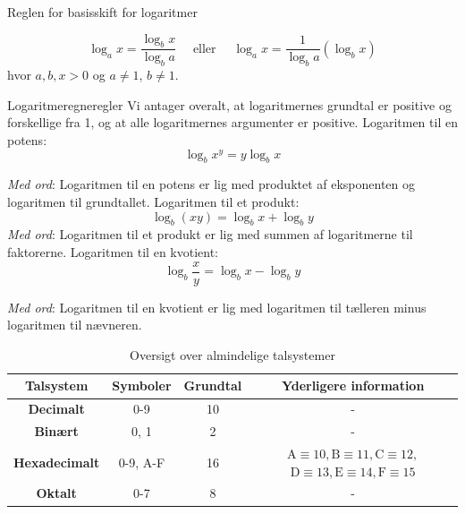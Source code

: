 \begin{custombox}{Reglen for basisskift for logaritmer}

\begin{equation*}
\log _a x=\frac{\log_b x}{\log_b a} \quad \text { eller } \quad \log_a x=\frac{1}{\log_b a}\left(\log_b x\right)
\end{equation*}
hvor $a,b,x>0$ og $a\neq1$, $b\neq1$.
    
\end{custombox}

\begin{custombox}{Logaritmeregneregler}
\setlength{\leftskip}{1cm}  %
\setlength{\rightskip}{1cm} %
Vi antager overalt, at logaritmernes grundtal er positive og forskellige fra 1, og at alle logaritmernes argumenter er positive.
Logaritmen til en potens:
$$
\log _b x^y=y \log _b x
$$

\textit{Med ord}: Logaritmen til en potens er lig med produktet af eksponenten og logaritmen til grundtallet.
\vspace{0.5cm}
Logaritmen til et produkt:
$$
\log _b(x y)=\log _b x+\log _b y
$$
\textit{Med ord}: Logaritmen til et produkt er lig med summen af logaritmerne til faktorerne.
\vspace{0.5cm}
Logaritmen til en kvotient:
$$
\log _b \frac{x}{y}=\log _b x-\log _b y
$$

\textit{Med ord}: Logaritmen til en kvotient er lig med logaritmen til tælleren minus logaritmen til nævneren.

\setlength{\leftskip}{0cm}  %
\setlength{\rightskip}{0cm} %

\end{custombox}


\begin{table}[ht]
\centering
\renewcommand{\arraystretch}{1.4}
\begin{tabular}{|c|c|c|c|}
\hline
\textbf{Talsystem} & \textbf{Symboler} & \textbf{Grundtal} & \textbf{Yderligere information} \\ \hline
\textbf{Decimalt} & 0-9 & 10 & - \\ \hline
\textbf{Binært} & 0, 1 & 2 & - \\ \hline
\textbf{Hexadecimalt} & 0-9, A-F & 16 & $\mathrm{A} \equiv 10, \mathrm{B} \equiv 11, \mathrm{C} \equiv 12,$ $\mathrm{D} \equiv 13, \mathrm{E} \equiv 14, \mathrm{F} \equiv 15$ \\ \hline
\textbf{Oktalt} & 0-7 & 8 & - \\ \hline
\end{tabular}
\caption{Oversigt over almindelige talsystemer}
\end{table}

